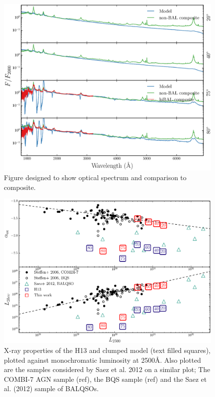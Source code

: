 \documentclass[useAMS,usenatbib]{mn2e_x}
\begin{document}
\begin{figure}
\centering
\includegraphics[width=1.0\textwidth]{figures/opt.eps}
\caption
{
Figure designed to show optical spectrum and comparison to composite.
}
\label{fig:uvspec}
\end{figure}

\begin{figure}
\centering
\includegraphics[width=1.0\textwidth]{figures/alpha_ox_both.eps}
\caption
{
X-ray properties of the H13 and clumped model (text filled 
squares), plotted against monochromatic luminosity 
at 2500\AA. Also plotted are the samples considered by
Saez et al. 2012 on a similar plot; The COMBI-7 AGN sample (ref),
the BQS sample (ref) and the Saez et al. (2012) sample of BALQSOs.
}
\label{fig:xray}
\end{figure}
\end{document}
